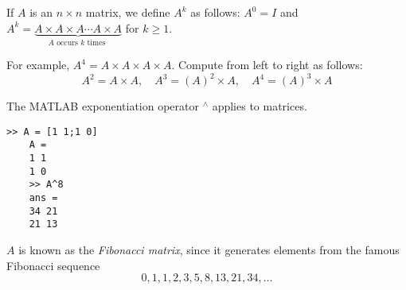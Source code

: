\documentclass[../main.tex]{subfiles}
\begin{document}
\begin{definition}
	\label{defn:defn_1_11}
	If $A$ is an $n \times n$ matrix, we define $A^{k}$ as follows: $A^{0}=I$ and $A^{k}=\underbrace{A \times A \times A \cdots A \times A}_{A \text { occurs } k \text { times }}$ for $k \geq 1$.

For example, $A^{4}=A \times A \times A \times A$. Compute from left to right as follows:
$$
A^{2}=A \times A, \quad A^{3}=(A)^{2} \times A, \quad A^{4}=(A)^{3} \times A
$$
\end{definition}

\begin{example} The MATLAB exponentiation operator $^{\wedge}$ applies to matrices.

\begin{lstlisting}[numbers=none,frame=none]
	>> A = [1 1;1 0]
	A =
	1 1
	1 0
	>> A^8
	ans =
	34 21
	21 13
\end{lstlisting}


$A$ is known as the \emph{Fibonacci matrix}, since it generates elements from the famous Fibonacci sequence
$$
0,1,1,2,3,5,8,13,21,34, \ldots
$$\\
\end{example}
\end{document}
